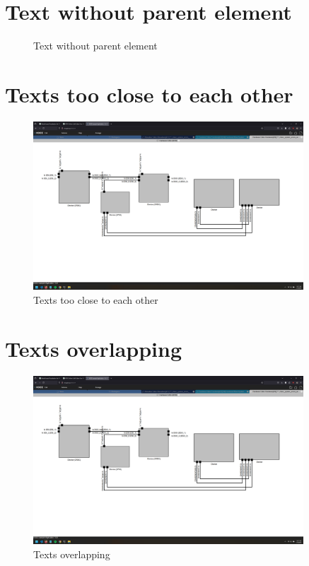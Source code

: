 \documentclass{article}
\begin{document}
\section{Text without parent element}
\begin{figure}[H]
    \centering
    \caption{Text without parent element}
\end{figure}
\newpage

\section{Texts too close to each other}
\begin{figure}[H]
    \centering
    \includegraphics[width=0.9\textwidth]{images/texts_too_close_to_each_other.png}
    \caption{Texts too close to each other}
\end{figure}
\newpage

\section{Texts overlapping}
\begin{figure}[H]
    \centering
    \includegraphics[width=0.9\textwidth]{images/texts_too_close_to_each_other.png}
    \caption{Texts overlapping}
\end{figure}
\newpage
\end{document}
